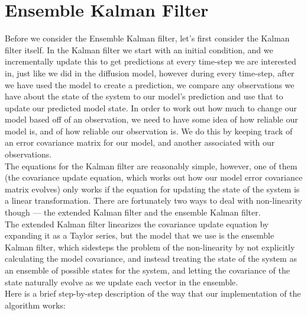 \documentclass[a4paper, fleqn]{article}
\begin{document}
\section{Ensemble Kalman Filter}
Before we consider the Ensemble Kalman filter, let's first consider the Kalman filter itself. In the Kalman filter we start with an initial condition, and we incrementally update this to get predictions at every time-step we are interested in, just like we did in the diffusion model, however during every time-step, after we have used the model to create a prediction, we compare any observations we have about the state of the system to our model's prediction and use that to update our predicted model state. In order to work out how much to change our model based off of an observation, we need to have some idea of how reliable our model is, and of how reliable our observation is. We do this by keeping track of an error covariance matrix for our model, and another associated with our observations.\\
The equations for the Kalman filter are reasonably simple, however, one of them (the covariance update equation, which works out how our model error covariance matrix evolves) only works if the equation for updating the state of the system is a linear transformation. There are fortunately two ways to deal with non-linearity though — the extended Kalman filter and the ensemble Kalman filter.\\
The extended Kalman filter linearizes the covariance update equation by expanding it as a Taylor series, but the model that we use is the ensemble Kalman filter, which sidesteps the problem of the non-linearity by not explicitly calculating the model covariance, and instead treating the state of the system as an ensemble of possible states for the system, and letting the covariance of the state naturally evolve as we update each vector in the ensemble.\\
Here is a brief step-by-step description of the way that our implementation of the algorithm works:
\end{document}
